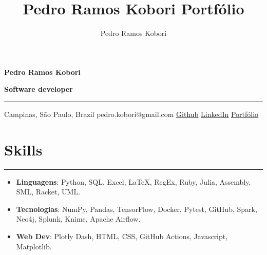 \documentclass[a4paper,10pt]{article}
\title{Pedro Ramos Kobori Portfólio}
\newcommand{\ulink}[2]{\href{#1}{\underline{#2}}}
\begin{document}
\date{}
\author{Pedro Ramos Kobori}

\noindent
\begin{minipage}[t]{0.5\textwidth}
  \begin{flushleft}
    \textbf{\Large Pedro Ramos Kobori}
  \end{flushleft}
\end{minipage}
\begin{minipage}[t]{0.5\textwidth}
  \begin{flushright}
    \textbf{\Large Software developer}
  \end{flushright}
\end{minipage}

\hrule

\vspace{2mm}
\noindent
{
  \centering
  Campinas, São Paulo, Brazil \textbar{}
  pedro.kobori@gmail.com \textbar{}
  \ulink{https://github.com/rokobo}{Github} \textbar{}
  \ulink{https://www.linkedin.com/in/pedrokobori/}{LinkedIn} \textbar{}
  \ulink{https://rokobo.github.io}{Portfólio}
  \par
}

\section*{Skills}
\hrule
\vspace{2mm}
\begin{itemize}[itemsep=0pt]
  \item \textbf{Linguagens}: Python, SQL, Excel, LaTeX, RegEx, Ruby, Julia, Assembly, SML, Racket, UML.
  \item \textbf{Tecnologias}: NumPy, Pandas, TensorFlow, Docker, Pytest, GitHub, Spark, Neo4j, Splunk, Knime, Apache Airflow.
  \item \textbf{Web Dev}: Plotly Dash, HTML, CSS, GitHub Actions, Javascript, Matplotlib.
\end{itemize}
\end{document}
